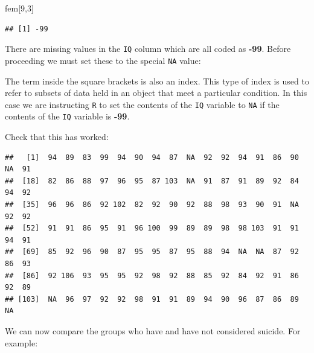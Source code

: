 \documentclass[]{book}
\newenvironment{Shaded}{\begin{snugshade}}{\end{snugshade}}
\newcommand{\DecValTok}[1]{\textcolor[rgb]{0.00,0.00,0.81}{#1}}
\newcommand{\StringTok}[1]{\textcolor[rgb]{0.31,0.60,0.02}{#1}}
\newcommand{\OtherTok}[1]{\textcolor[rgb]{0.56,0.35,0.01}{#1}}
\newcommand{\OperatorTok}[1]{\textcolor[rgb]{0.81,0.36,0.00}{\textbf{#1}}}
\newcommand{\NormalTok}[1]{#1}
\theoremstyle{definition}
\theoremstyle{definition}
\theoremstyle{definition}
\theoremstyle{remark}
\begin{document}
\begin{Shaded}
\begin{Highlighting}[]
\NormalTok{fem[}\DecValTok{9}\NormalTok{,}\DecValTok{3}\NormalTok{]}
\end{Highlighting}
\end{Shaded}

\begin{verbatim}
## [1] -99
\end{verbatim}

There are missing values in the \texttt{IQ} column which are all coded
as \textbf{-99}. Before proceeding we must set these to the special
\texttt{NA} value:

\begin{Shaded}
\end{Shaded}

The term inside the square brackets is also an index. This type of index
is used to refer to subsets of data held in an object that meet a
particular condition. In this case we are instructing \texttt{R} to set
the contents of the \texttt{IQ} variable to \texttt{NA} if the contents
of the \texttt{IQ} variable is \textbf{-99}.

Check that this has worked:

\begin{Shaded}
\end{Shaded}

\begin{verbatim}
##   [1]  94  89  83  99  94  90  94  87  NA  92  92  94  91  86  90  NA  91
##  [18]  82  86  88  97  96  95  87 103  NA  91  87  91  89  92  84  94  92
##  [35]  96  96  86  92 102  82  92  90  92  88  98  93  90  91  NA  92  92
##  [52]  91  91  86  95  91  96 100  99  89  89  98  98 103  91  91  94  91
##  [69]  85  92  96  90  87  95  95  87  95  88  94  NA  NA  87  92  86  93
##  [86]  92 106  93  95  95  92  98  92  88  85  92  84  92  91  86  92  89
## [103]  NA  96  97  92  92  98  91  91  89  94  90  96  87  86  89  NA
\end{verbatim}

We can now compare the groups who have and have not considered suicide.
For example:
\end{document}
